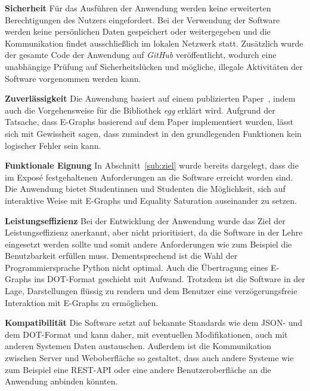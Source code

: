 \noindent\textbf{Sicherheit} Für das Ausführen der Anwendung werden keine erweiterten Berechtigungen des Nutzers eingefordert. Bei der Verwendung der Software werden keine persönlichen Daten gespeichert 
oder weitergegeben und die Kommunikation findet ausschließlich im lokalen Netzwerk statt.
Zusätzlich wurde der gesamte Code der Anwendung auf \textit{GitHub} veröffentlicht, wodurch eine unabhängige Prüfung auf Sicherheitslücken und mögliche, illegale Aktivitäten der Software vorgenommen werden kann.

\noindent\textbf{Zuverlässigkeit} Die Anwendung basiert auf einem publizierten Paper~\cite{2021-egg}, indem auch die Vorgehensweise für die Bibliothek \textit{egg} erklärt wird.
Aufgrund der Tatsache, dass E-Graphs basierend auf dem Paper implementiert wurden, lässt sich mit Gewissheit sagen, dass zumindest in den grundlegenden Funktionen kein logischer Fehler sein kann.



\noindent\textbf{Funktionale Eignung} In Abschnitt~\ref{sub:ziel} wurde bereits dargelegt, dass die im Exposé festgehaltenen Anforderungen an die Software erreicht worden sind.
Die Anwendung bietet Studentinnen und Studenten die Möglichkeit, sich auf interaktive Weise mit E-Graphs und Equality Saturation auseinander zu setzen.





\noindent\textbf{Leistungseffizienz} Bei der Entwicklung der Anwendung wurde das Ziel der Leistungseffizienz anerkannt, aber nicht prioritisiert, da die Software in der Lehre eingesetzt werden sollte
und somit andere Anforderungen wie zum Beispiel die Benutzbarkeit erfüllen muss. Dementsprechend ist die Wahl der Programmiersprache Python nicht optimal. Auch die Übertragung eines E-Graphs ins DOT-Format 
geschieht mit Aufwand. Trotzdem ist die Software in der Lage, Darstellungen flüssig zu rendern und dem Benutzer eine verzögerungsfreie Interaktion mit E-Graphs zu ermöglichen.

\noindent\textbf{Kompatibilität} Die Software setzt auf bekannte Standards wie dem JSON- und dem DOT-Format und kann daher, mit eventuellen Modifikationen, auch mit anderen Systemen Daten austauschen.
Außerdem ist die Kommunikation zwischen Server und Weboberfläche so gestaltet, dass auch andere Systeme wie zum Beispiel eine REST-API oder eine andere Benutzeroberfläche an die Anwendung anbinden könnten.

